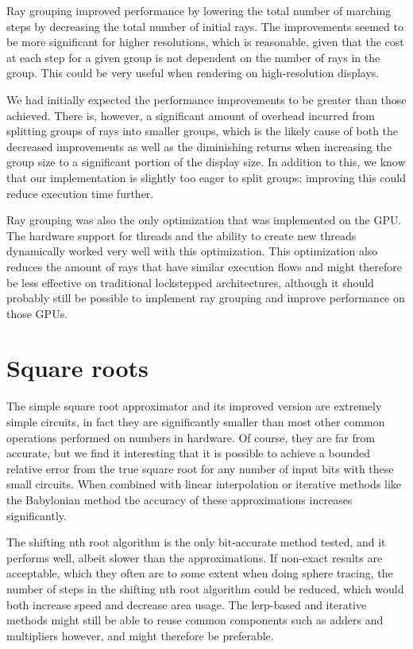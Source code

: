 			Ray grouping improved performance by lowering the total number of
			marching steps by decreasing the total number of initial rays. The
			improvements seemed to be more significant for higher resolutions,
			which is reasonable, given that the cost at each step for a given
			group is not dependent on the number of rays in the group. This 
			could be very useful when rendering on high-resolution displays.
			
			We had initially expected the performance improvements to be greater
			than those achieved. There is, however, a significant amount of
			overhead incurred from splitting groups of rays into smaller
			groups, which is the likely cause of both the decreased
			improvements as well as the diminishing returns when increasing the
			group size to a significant portion of the display size. In
			addition to this, we know that our implementation is slightly too
			eager to split groups; improving this could reduce execution time
			further.

			Ray grouping was also the only optimization that was implemented on
			the GPU. The hardware support for threads and the ability to
			create new threads dynamically worked very well with this
			optimization. This optimization also reduces the amount of rays
			that have similar execution flows and might therefore be less
			effective on traditional lockstepped architectures, although it
			should probably still be possible to implement ray grouping and
			improve performance on those GPUs.

	\section{Square roots}

		The simple square root approximator and its improved version are
		extremely simple circuits, in fact they are significantly smaller than
		most other common operations performed on numbers in hardware. Of
		course, they are far from accurate, but we find it interesting that it
		is possible to achieve a bounded relative error from the true square
		root for any number of input bits with these small circuits. When
		combined with linear interpolation or iterative methods like the
		Babylonian method the accuracy of these approximations increases
		significantly.
		
		The shifting nth root algorithm is the only bit-accurate method tested,
		and it performs well, albeit slower than the approximations. If
		non-exact results are acceptable, which they often are to some extent
		when doing sphere tracing, the number of steps in the shifting nth root
		algorithm could be reduced, which would both increase speed and
		decrease area usage. The lerp-based and iterative methods might still
		be able to reuse common components such as adders and multipliers
		however, and might therefore be preferable.
		
